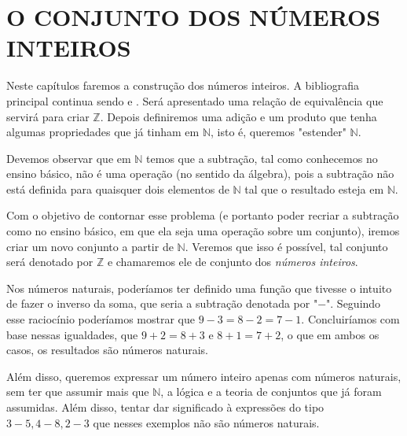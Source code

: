 \documentclass[../main.tex]{subfiles}
\begin{document}
\chapter{O CONJUNTO DOS NÚMEROS INTEIROS}
Neste capítulos faremos a construção dos números inteiros. A bibliografia principal continua sendo \textcite{ferreira} e \textcite{domingues-2009}. Será apresentado uma relação de equivalência que servirá para criar $\mathbb{Z}$. Depois definiremos uma adição e um produto que tenha algumas propriedades que já tinham em $\mathbb{N}$, isto é, queremos "estender"  $\mathbb{N}$.

Devemos observar que em $\mathbb{N}$ temos que a subtração, tal como conhecemos no ensino básico, não é uma operação (no sentido da álgebra), pois a subtração não está definida para quaisquer dois elementos de $\mathbb{N}$ tal que o resultado esteja em $\mathbb{N}$.

Com o objetivo de contornar esse problema (e portanto poder recriar a subtração como no ensino básico, em que ela seja uma operação sobre um conjunto), iremos criar um novo conjunto a partir de $\mathbb{N}$. Veremos que isso é possível, tal conjunto será denotado por $\mathbb{Z}$ e chamaremos ele de conjunto dos \emph{números inteiros}.

Nos números naturais, poderíamos ter definido uma função que tivesse o intuito de fazer o inverso da soma, que seria a subtração denotada por "$-$". Seguindo esse raciocínio poderíamos mostrar que $9-3 = 8-2 = 7-1$. Concluiríamos com base nessas igualdades, que $9 + 2 = 8 + 3$ e $8 + 1 = 7 + 2$, o que em ambos os casos, os resultados são números naturais. 

Além disso, queremos expressar um número inteiro apenas com números naturais, sem ter que assumir mais que $\mathbb{N}$, a lógica e a teoria de conjuntos que já foram assumidas. Além disso, tentar dar significado à expressões do tipo $3-5, 4-8, 2-3$ que nesses exemplos não são números naturais.
\end{document}
